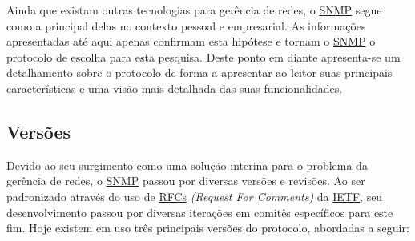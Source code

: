 \documentclass[twoside,english,brazilian]{UNISINOSmonografia}
\begin{document}
Ainda que existam outras tecnologias para gerência de redes, o \hyperref[siglas]{SNMP} segue 
como a principal delas no contexto pessoal e empresarial.
As informações apresentadas até aqui apenas confirmam esta hipótese
e tornam o \hyperref[siglas]{SNMP} o protocolo de escolha para esta pesquisa.
Deste ponto em diante apresenta-se um detalhamento sobre o protocolo de forma
a apresentar ao leitor suas principais características e uma visão mais 
detalhada das suas funcionalidades.



\subsection{Versões}

Devido ao seu surgimento como uma solução interina para o problema da gerência 
de redes, o \hyperref[siglas]{SNMP} passou por diversas versões e revisões.
Ao ser padronizado através do uso de \hyperref[siglas]{RFCs} \textit{(Request For Comments)} 
da \hyperref[siglas]{IETF}, seu desenvolvimento passou por diversas iterações em comitês 
específicos para este fim.
Hoje existem em uso três principais versões do protocolo, abordadas a seguir:
\end{document}
